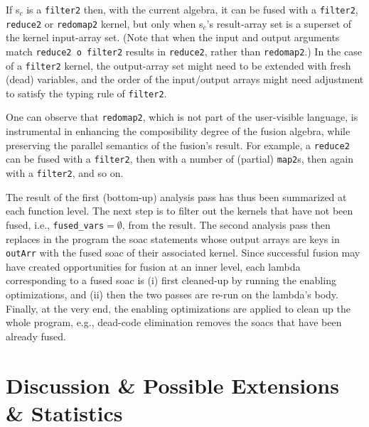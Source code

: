 \documentclass{sigplanconf}  %
\begin{document}
If {\sc s}$_c$ is a {\tt filter2} then, with the current algebra, it can be fused
with a {\tt filter2}, {\tt reduce2} or {\tt redomap2} kernel, but only when
{\sc s}$_c$'s result-array set is a superset of the kernel input-array set.
(Note that when the input and output arguments match {\tt reduce2 o filter2}
results in {\tt reduce2}, rather than {\tt redomap2}.) 
In the case of a {\tt filter2} kernel, the output-array set might need to 
be extended with fresh (dead) variables, and the order of the input/output
arrays might need adjustment to satisfy the typing rule of {\tt filter2}.


One can observe that {\tt redomap2}, which is not part of the user-visible language, 
is instrumental in enhancing the composibility degree of the fusion algebra, 
while preserving the parallel semantics of the fusion's result. 
For example, a {\tt reduce2} can be fused with a {\tt filter2}, then with a 
number of (partial) {\tt map2}s, then again with a {\tt filter2}, and so on. 

The result of the first (bottom-up) analysis pass has thus been summarized
at each function level. The next step is to filter out the kernels that have 
not been fused, i.e., {\tt fused\_vars$=\emptyset$}, from the result.
The second analysis pass then replaces in the program the {\sc soac} 
statements whose output arrays are keys in {\tt outArr} with the fused 
{\sc soac} of their associated kernel.  Since successful fusion may have 
created opportunities for fusion at an inner level, each lambda 
corresponding to a fused {\sc soac} is (i) first cleaned-up by running the
enabling optimizations, and (ii) then the two passes are re-run on the
lambda's body.   Finally, at the very end, the enabling optimizations
are applied to clean up the whole program, e.g., dead-code elimination 
removes the {\sc soac}s that have been already fused. 
 




\section{Discussion \& Possible Extensions \& Statistics}
\label{sec:Discuss}
\end{document}
